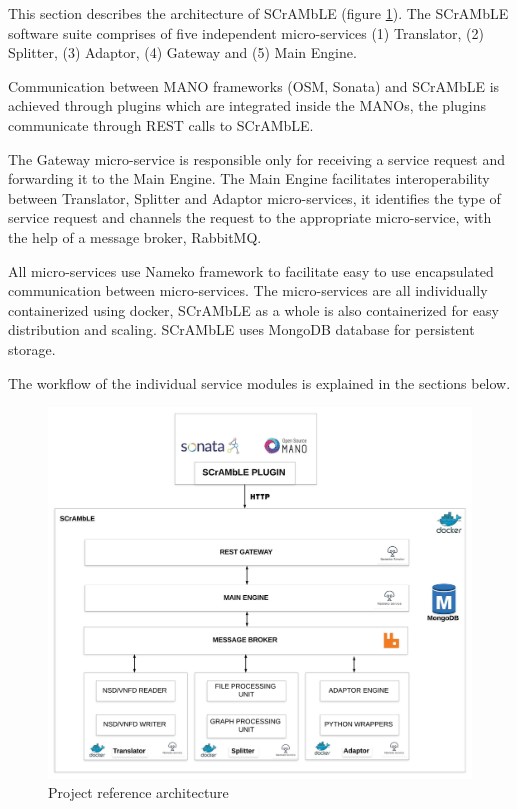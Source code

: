 This section describes the architecture of SCrAMbLE (figure \ref{fig:Scramble_Architecture}). The SCrAMbLE software suite comprises of five independent micro-services (1) Translator, (2) Splitter, (3) Adaptor, (4) Gateway and (5) Main Engine.

Communication between MANO frameworks (OSM, Sonata) and SCrAMbLE is achieved through plugins which are integrated inside the MANOs, the plugins communicate through REST calls to SCrAMbLE.

The Gateway micro-service is responsible only for receiving a service request and forwarding it to the Main Engine. The Main Engine facilitates interoperability between Translator, Splitter and Adaptor micro-services, it identifies the type of service request and channels the request to the appropriate micro-service, with the help of a message broker, RabbitMQ.

All micro-services use Nameko framework to facilitate easy to use encapsulated communication between micro-services. The micro-services are all individually containerized using docker, SCrAMbLE as a whole is also containerized for easy distribution and scaling. SCrAMbLE uses MongoDB database for persistent storage.

The workflow of the individual service modules is explained in the sections below.


\begin{figure}[H]
	\centering
	\includegraphics[width=0.9\linewidth]{figures/Scramble_Architecture}
	\caption{Project reference architecture}
	\label{fig:Scramble_Architecture}
\end{figure}

